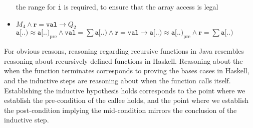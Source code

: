 \documentclass[a4paper, 12pt]{article}
\begin{document}
\begin{itemize}
                        \subitem the range for \texttt{i} is required, to ensure that the array access is legal
                    \item $M_4 \land \textbf{r} = \texttt{val} \rightarrow Q_2$
                        \subitem $\texttt{a[..)} \approx \texttt{a[..)}_\text{pre} \land \texttt{val} = \sum \texttt{a[..)} \land \textbf{r} = \texttt{val} \rightarrow \texttt{a[..)} \approx \texttt{a[..)}_\text{pre} \land \textbf{r} = \sum \texttt{a[..)}$
                \end{itemize}
                For obvious reasons, reasoning regarding recursive functions in Java resembles reasoning about recursively defined functions in Haskell. Reasoning about the when the function terminates corresponds to proving the bases cases in Haskell, and the inductive steps are reasoning about when the function calls itself. Establishing the inductive hypothesis holds corresponds to the point where we establish the pre-condition of the callee holds, and the point where we establish the post-condition implying the mid-condition mirrors the conclusion of the inductive step.
\end{document}
